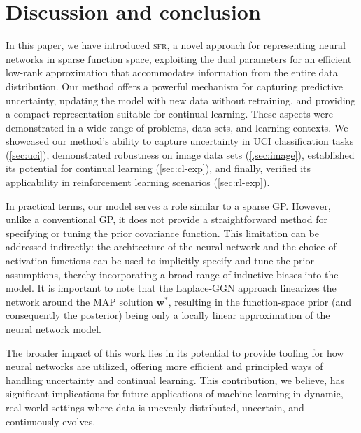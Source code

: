 \documentclass{article} %
\newcommand{\our}{\textsc{sfr}\xspace}
\newcommand{\weights}{\ensuremath{\mathbf{w}}}
\begin{document}
\section{Discussion and conclusion}
\label{sec:conclusion}
%
In this paper, we have introduced \our, a novel approach for representing neural networks in sparse function space, exploiting the dual parameters for an efficient low-rank approximation that accommodates information from the entire data distribution. Our method offers a powerful mechanism for capturing predictive uncertainty, updating the model with new data without retraining, and providing a compact representation suitable for continual learning. These aspects were demonstrated in a wide range of problems, data sets, and learning contexts. We showcased our method's ability to capture uncertainty in UCI classification tasks (\cref{sec:uci}), demonstrated robustness on image data sets (\cref{,sec:image}), established its potential for continual learning (\cref{sec:cl-exp}), and finally, verified its applicability in reinforcement learning scenarios (\cref{sec:rl-exp}).

In practical terms, our model serves a role similar to a sparse GP. However, unlike a conventional GP, it does not provide a straightforward method for specifying or tuning the prior covariance function. This limitation can be addressed indirectly: the architecture of the neural network and the choice of activation functions can be used to implicitly specify and tune the prior assumptions, thereby incorporating a broad range of inductive biases into the model. It is important to note that the Laplace-GGN approach linearizes the network around the MAP solution $\weights^{*}$, resulting in the function-space prior (and consequently the posterior) being only a locally linear approximation of the neural network model.




The broader impact of this work lies in its potential to provide tooling for how neural networks are utilized, offering more efficient and principled ways of handling uncertainty and continual learning. This contribution, we believe, has significant implications for future applications of machine learning in dynamic, real-world settings where data is unevenly distributed, uncertain, and continuously evolves.
\end{document}
